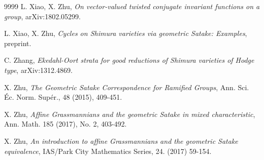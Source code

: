 \documentclass[11pt]{amsart}
\theoremstyle{definition}
\theoremstyle{definition}
\theoremstyle{definition}
\numberwithin{equation}{subsection}
\begin{document}
\begin{thebibliography}{9999}
L. Xiao, X. Zhu, {\it On vector-valued twisted conjugate invariant functions on a group}, arXiv:1802.05299.

L. Xiao, X. Zhu, {\it Cycles on Shimura varieties via geometric Satake: Examples}, preprint.

 C. Zhang, {\it Ekedahl-Oort strata for good reductions of Shimura varieties of Hodge type}, arXiv:1312.4869.

X. Zhu, {\it The Geometric Satake Correspondence for Ramified Groups}, Ann. Sci. \'Ec. Norm. Sup\'er., 48 (2015),
409-451.

X. Zhu, {\it Affine Grassmannians and the geometric Satake in mixed characteristic}, Ann. Math. 185 (2017), No. 2, 403-492.

X. Zhu, {\it An introduction to affine Grassmannians and the geometric Satake equivalence}, IAS/Park City Mathematics Series, 24. (2017) 59-154.


\end{thebibliography}
\end{document}

